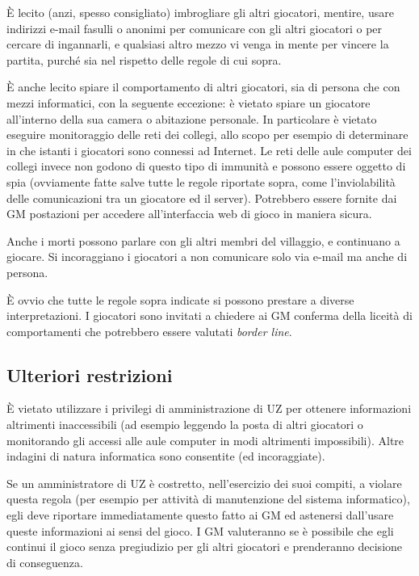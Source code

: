 \documentclass[a4paper,10pt]{article}
\begin{document}
È lecito (anzi, spesso consigliato) imbrogliare gli altri giocatori, mentire, usare indirizzi e-mail fasulli o anonimi per comunicare con gli altri giocatori o per cercare di ingannarli, e qualsiasi altro mezzo vi venga in mente per vincere la partita, purché sia nel rispetto delle regole di cui sopra.

È anche lecito spiare il comportamento di altri giocatori, sia di persona che con mezzi informatici, con la seguente eccezione: è vietato spiare un giocatore all'interno della sua camera o abitazione personale. In particolare è vietato eseguire monitoraggio delle reti dei collegi, allo scopo per esempio di determinare in che istanti i giocatori sono connessi ad Internet. Le reti delle aule computer dei collegi invece non godono di questo tipo di immunità e possono essere
oggetto di spia (ovviamente fatte salve tutte le regole riportate sopra, come l'inviolabilità delle comunicazioni tra un giocatore ed il server). Potrebbero essere fornite dai GM postazioni per accedere all'interfaccia web di gioco in maniera sicura.

Anche i morti possono parlare con gli altri membri del villaggio, e continuano a giocare. Si incoraggiano i giocatori a non comunicare solo via e-mail ma anche di persona.

È ovvio che tutte le regole sopra indicate si possono prestare a diverse interpretazioni. I giocatori sono invitati a chiedere ai GM conferma della liceità di comportamenti che potrebbero essere valutati \emph{border line}.


\subsection{Ulteriori restrizioni}

È vietato utilizzare i privilegi di amministrazione di UZ per ottenere informazioni altrimenti inaccessibili (ad esempio leggendo la posta di altri giocatori o monitorando gli accessi alle aule computer in modi altrimenti impossibili). Altre indagini di natura informatica sono consentite (ed incoraggiate).

Se un amministratore di UZ è costretto, nell'esercizio dei suoi compiti, a violare questa regola (per esempio per attività di manutenzione del sistema informatico), egli deve riportare immediatamente questo fatto ai GM ed astenersi dall'usare queste informazioni ai sensi del gioco. I GM valuteranno se è possibile che egli continui il gioco senza pregiudizio per gli altri giocatori e prenderanno decisione di conseguenza.
\end{document}
